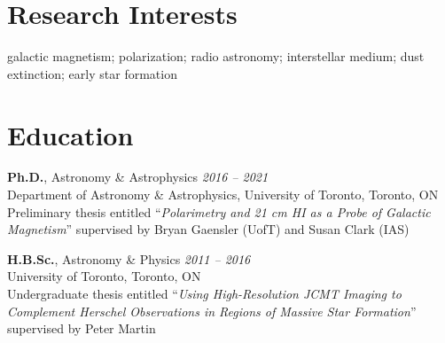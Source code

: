 \documentclass[10pt]{res} %
\begin{document}
\begin{resume}


\section{\Large Research Interests}
\vspace{-5pt} %
\noindent\makebox[\linewidth]{\rule{\textwidth}{0.4pt}}
\vspace{-20pt} %

galactic magnetism; polarization; radio astronomy; interstellar medium; dust extinction; early star formation




\section{\Large Education}
\vspace{-5pt} %
\noindent\makebox[\linewidth]{\rule{\textwidth}{0.4pt}}
\vspace{-20pt} %

{\bf Ph.D.}, Astronomy \& Astrophysics \hfill \textit{2016 -- 2021} \\
Department of Astronomy \& Astrophysics, University of Toronto, Toronto, ON \\
Preliminary thesis entitled ``\textit{Polarimetry and 21 cm HI as a Probe of Galactic Magnetism}'' supervised by Bryan Gaensler (UofT) and Susan Clark (IAS)

{\bf H.B.Sc.}, Astronomy \& Physics \hfill \textit{2011 -- 2016} \\ 
University of Toronto, Toronto, ON \\ 
Undergraduate thesis entitled ``\textit{Using High-Resolution JCMT Imaging to Complement Herschel Observations in Regions of Massive Star Formation}'' supervised by Peter Martin
 

\end{resume}
\end{document}
